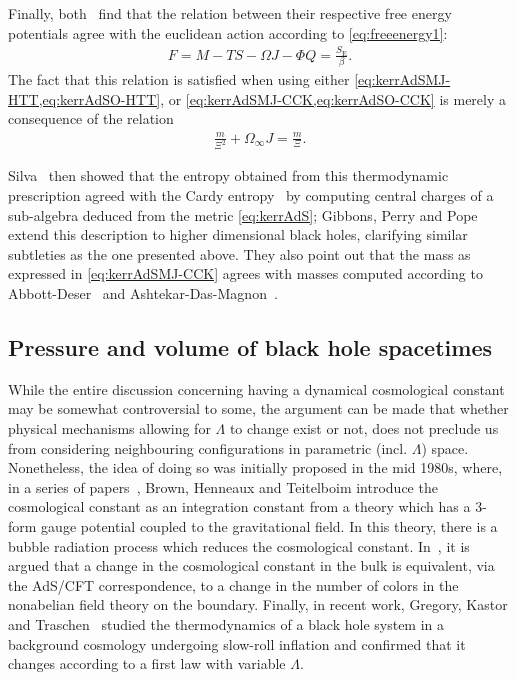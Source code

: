 \documentclass[
twoside,
openright,
frontopenright,
]{dmathesis}
\begin{document}
Finally, both~\cite{Hawking:1998kw,Caldarelli:1999xj} find that the relation
between their respective free energy potentials agree with the euclidean action
according to \cref{eq:freeenergy1}:
\begin{align}
  F = M- TS - \Omega J-\Phi Q = \frac{S_\mathrm{E}}{\beta}.
\end{align}
The fact that this relation is satisfied when using either
\cref{eq:kerrAdSMJ-HTT,eq:kerrAdSO-HTT}, or
\cref{eq:kerrAdSMJ-CCK,eq:kerrAdSO-CCK} is merely a consequence of the relation
\begin{align*}
  \frac{m}{\Xi^2}+\Omega_\infty J = \frac{m}{\Xi}.
\end{align*}

Silva~\cite{Silva:2002jq} then showed that the entropy obtained from this
thermodynamic prescription agreed with the Cardy
entropy~\cite{Cardy:1986ie,Bloete:1986qm} by computing central charges of a
sub-algebra deduced from the metric \cref{eq:kerrAdS}; Gibbons, Perry and
Pope~\cite{Gibbons:2004ai} extend this description to higher dimensional black
holes, clarifying similar subtleties as the one presented above. They also point
out that the mass as expressed in \cref{eq:kerrAdSMJ-CCK} agrees with masses
computed according to Abbott-Deser~\cite{Abbott:1981ff} and
Ashtekar-Das-Magnon~\cite{Ashtekar:1984zz,Ashtekar:1999jx}.

\subsection{Pressure and volume of black hole spacetimes}
\label{sec:press-volume-black}

While the entire discussion concerning having a dynamical cosmological constant
may be somewhat controversial to some, the argument can be made that whether
physical mechanisms allowing for $\Lambda$ to change exist or not, does not
preclude us from considering neighbouring configurations in parametric
(incl. $\Lambda$) space. Nonetheless, the idea of doing so was initially
proposed in the mid 1980s, where, in a series of papers~\cite{Henneaux:1984ji,
  Teitelboim:1985dp, Henneaux:1985tv, Brown:1987dd, Brown:1988kg,
  Henneaux:1989zc}, Brown, Henneaux and Teitelboim introduce the cosmological
constant as an integration constant from a theory which has a 3-form gauge
potential coupled to the gravitational field. In this theory, there is a bubble
radiation process which reduces the cosmological
constant. In~\cite{Kastor:2009wy}, it is argued that a change in the
cosmological constant in the bulk is equivalent, via the AdS/CFT correspondence,
to a change in the number of colors in the nonabelian field theory on the
boundary. Finally, in recent work, Gregory, Kastor and
Traschen~\cite{Gregory:2017sor,Gregory:2018ghc} studied the thermodynamics of a
black hole system in a background cosmology undergoing slow-roll inflation and
confirmed that it changes according to a first law with variable $\Lambda$.
\end{document}
